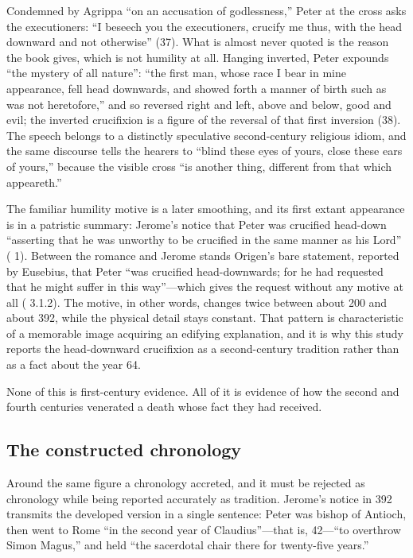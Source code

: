Condemned by Agrippa ``on an accusation of godlessness,'' Peter at the cross
asks the executioners: ``I beseech you the executioners, crucify me thus,
with the head downward and not otherwise'' (37). What is almost never quoted
is the reason the book gives, which is not humility at all. Hanging inverted,
Peter expounds ``the mystery of all nature'': ``the first man, whose race I
bear in mine appearance, fell head downwards, and showed forth a manner of
birth such as was not heretofore,'' and so reversed right and left, above and
below, good and evil; the inverted crucifixion is a figure of the reversal of
that first inversion (38). The speech belongs to a distinctly speculative
second-century religious idiom, and the same discourse tells the hearers to
``blind these eyes of yours, close these ears of yours,'' because the visible
cross ``is another thing, different from that which appeareth.''

The familiar humility motive is a later smoothing, and its first extant
appearance is in a patristic summary: Jerome's notice that Peter was
crucified head-down ``asserting that he was unworthy to be crucified in the
same manner as his Lord'' ( 1). Between the romance
and Jerome stands Origen's bare statement, reported by Eusebius, that Peter
``was crucified head-downwards; for he had requested that he might suffer in
this way''---which gives the request without any motive at all
( 3.1.2). The motive, in other words, changes twice
between about 200 and about 392, while the physical detail stays constant.
That pattern is characteristic of a memorable image acquiring an edifying
explanation, and it is why this study reports the head-downward crucifixion
as a second-century tradition rather than as a fact about the year 64.

None of this is first-century evidence. All of it is evidence of how the
second and fourth centuries venerated a death whose fact they had received.

\subsection{The constructed chronology}

Around the same figure a chronology accreted, and it must be rejected as
chronology while being reported accurately as tradition. Jerome's notice in
392 transmits the developed version in a single sentence: Peter was bishop of
Antioch, then went to Rome ``in the second year of Claudius''---that is,
42---``to overthrow Simon Magus,'' and held ``the sacerdotal chair there for
twenty-five years.''

